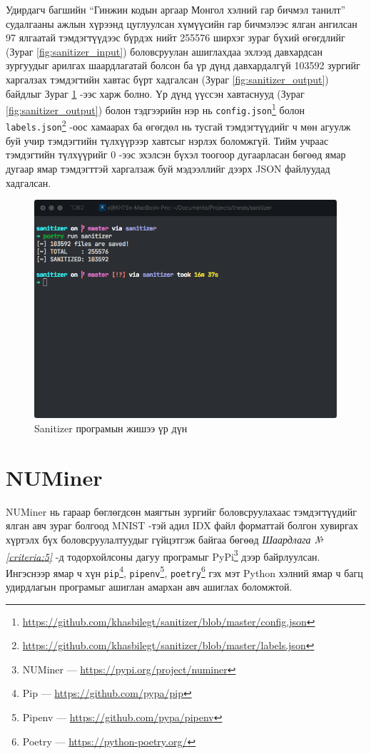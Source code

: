Удирдагч багшийн “Гинжин кодын аргаар Монгол хэлний гар бичмэл танилт” \cite{mongolian-htr-using-chain-code} судалгааны ажлын хүрээнд цуглуулсан хүмүүсийн гар бичмэлээс ялган ангилсан 97 ялгаатай тэмдэгтүүдээс бүрдэх нийт 255576 ширхэг зураг бүхий өгөгдлийг (Зураг \ref{fig:sanitizer_input}) боловсруулан ашиглахдаа эхлээд давхардсан зургуудыг арилгах шаардлагатай болсон ба үр дүнд давхардалгүй 103592 зургийг харгалзах тэмдэгтийн хавтас бүрт хадгалсан (Зураг \ref{fig:sanitizer_output}) байдлыг Зураг \ref{fig:sanitizer_result} -ээс харж болно. Үр дүнд үүссэн хавтаснууд (Зураг \ref{fig:sanitizer_output}) болон тэдгээрийн нэр нь \texttt{config.json}\footnote{\url{https://github.com/khasbilegt/sanitizer/blob/master/config.json}} болон \texttt{labels.json}\footnote{\url{https://github.com/khasbilegt/sanitizer/blob/master/labels.json}} -оос хамаарах ба өгөгдөл нь тусгай тэмдэгтүүдийг ч мөн агуулж буй учир тэмдэгтийн түлхүүрээр хавтсыг нэрлэх боломжгүй. Тийм учраас тэмдэгтийн түлхүүрийг 0 -ээс эхэлсэн бүхэл тоогоор дугаарласан бөгөөд ямар дугаар ямар тэмдэгттэй харгалзаж буй мэдээллийг дээрх JSON файлуудад хадгалсан.

\begin{figure}[ht]
	\centering
	\includegraphics[width=0.9\linewidth]{images/sanitizer}
	\caption{Sanitizer програмын жишээ үр дүн}
	\label{fig:sanitizer_result}
\end{figure}

\section{NUMiner}

NUMiner нь гараар бөглөгдсөн маягтын зургийг боловсруулахаас тэмдэгтүүдийг ялган авч зураг болгоод MNIST -тэй адил IDX файл форматтай болгон хувиргах хүртэлх бүх боловсруулалтуудыг гүйцэтгэж байгаа бөгөөд \textit{Шаардлага №\ref{criteria:5}} -д тодорхойлсоны дагуу програмыг PyPi\footnote{NUMiner --- \url{https://pypi.org/project/numiner}} дээр байрлуулсан. Ингэснээр ямар ч хүн \texttt{pip}\footnote{Pip --- \url{https://github.com/pypa/pip}}, \texttt{pipenv}\footnote{Pipenv --- \url{https://github.com/pypa/pipenv}}, \texttt{poetry}\footnote{Poetry --- \url{https://python-poetry.org/}} гэх мэт Python хэлний ямар ч багц удирдлагын програмыг ашиглан амархан авч ашиглах боломжтой.

